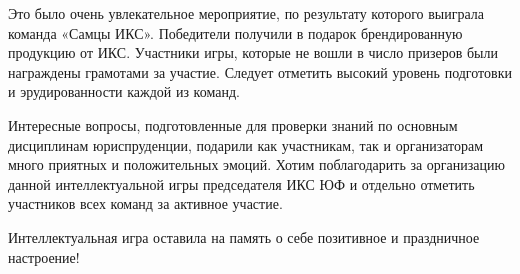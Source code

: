 
Это было очень увлекательное мероприятие, по результату которого выиграла
команда  «Самцы ИКС». Победители получили в подарок брендированную продукцию от
ИКС. Участники игры, которые не вошли в число призеров были награждены
грамотами за участие. Следует отметить высокий уровень подготовки и
эрудированности каждой из команд.

Интересные вопросы, подготовленные для проверки знаний по основным дисциплинам
юриспруденции, подарили как участникам, так и организаторам много приятных и
положительных эмоций. Хотим поблагодарить за организацию данной
интеллектуальной игры председателя ИКС ЮФ и отдельно отметить участников всех
команд за активное участие.

Интеллектуальная игра оставила на память о себе позитивное и праздничное
настроение!
